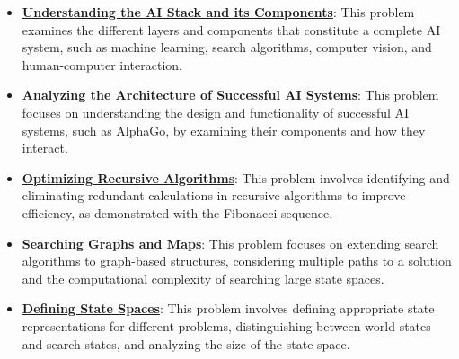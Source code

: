 \documentclass{article}%
\begin{document}
\begin{itemize}[leftmargin=*]
\item \href{https://purdue.brightspace.com/d2l/common/assets/pdfjs-d2l-dist/1.0.14-legacy/web/viewer.html?file=\%2Fcontent\%2Fenforced\%2F1095467-wl.202510.CS.24300.001\%2F02L2-Intro.pdf\%3Fou\%3D1095467\&lang=en-us\&container=d2l-fileviewer-rendered-pdf\&fullscreen=d2l-fileviewer-rendered-pdf-dialog\&height=667#page=44}{\textbf{Understanding the AI Stack and its Components}}: This problem examines the different layers and components that constitute a complete AI system, such as machine learning, search algorithms, computer vision, and human-computer interaction.%
\item \href{https://purdue.brightspace.com/d2l/common/assets/pdfjs-d2l-dist/1.0.14-legacy/web/viewer.html?file=\%2Fcontent\%2Fenforced\%2F1095467-wl.202510.CS.24300.001\%2F02L2-Intro.pdf\%3Fou\%3D1095467\&lang=en-us\&container=d2l-fileviewer-rendered-pdf\&fullscreen=d2l-fileviewer-rendered-pdf-dialog\&height=667#page=50}{\textbf{Analyzing the Architecture of Successful AI Systems}}: This problem focuses on understanding the design and functionality of successful AI systems, such as AlphaGo, by examining their components and how they interact.%
\item \href{https://purdue.brightspace.com/d2l/common/assets/pdfjs-d2l-dist/1.0.14-legacy/web/viewer.html?file=\%2Fcontent\%2Fenforced\%2F1095467-wl.202510.CS.24300.001\%2F14L1-DepthFS.pdf\%3Fou\%3D1095467\&lang=en-us\&container=d2l-fileviewer-rendered-pdf\&fullscreen=d2l-fileviewer-rendered-pdf-dialog\&height=667#page=21}{\textbf{Optimizing Recursive Algorithms}}: This problem involves identifying and eliminating redundant calculations in recursive algorithms to improve efficiency, as demonstrated with the Fibonacci sequence.%
\item \href{https://purdue.brightspace.com/d2l/common/assets/pdfjs-d2l-dist/1.0.14-legacy/web/viewer.html?file=\%2Fcontent\%2Fenforced\%2F1095467-wl.202510.CS.24300.001\%2F14L1-DepthFS.pdf\%3Fou\%3D1095467\&lang=en-us\&container=d2l-fileviewer-rendered-pdf\&fullscreen=d2l-fileviewer-rendered-pdf-dialog\&height=667#page=25}{\textbf{Searching Graphs and Maps}}: This problem focuses on extending search algorithms to graph-based structures, considering multiple paths to a solution and the computational complexity of searching large state spaces.%
\item \href{https://purdue.brightspace.com/d2l/common/assets/pdfjs-d2l-dist/1.0.14-legacy/web/viewer.html?file=\%2Fcontent\%2Fenforced\%2F1095467-wl.202510.CS.24300.001\%2F14L1-DepthFS.pdf\%3Fou\%3D1095467\&lang=en-us\&container=d2l-fileviewer-rendered-pdf\&fullscreen=d2l-fileviewer-rendered-pdf-dialog\&height=667#page=37}{\textbf{Defining State Spaces}}: This problem involves defining appropriate state representations for different problems, distinguishing between world states and search states, and analyzing the size of the state space.%

\end{itemize}
\end{document}
